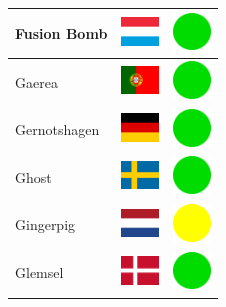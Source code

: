 \documentclass[12pt, a4paper, twoside]{report}
\begin{document}
\begin{center}
\begin{longtable}{|p{5cm}|p{2cm}|p{2cm}|}
Fusion Bomb & \includegraphics[width=1cm]{4x3/lu} & \includegraphics[width=1cm]{likes/y} \\ \hline
Gaerea & \includegraphics[width=1cm]{4x3/pt} & \includegraphics[width=1cm]{likes/y} \\ \hline
Gernotshagen & \includegraphics[width=1cm]{4x3/de} & \includegraphics[width=1cm]{likes/y} \\ \hline
Ghost & \includegraphics[width=1cm]{4x3/se} & \includegraphics[width=1cm]{likes/y} \\ \hline
Gingerpig & \includegraphics[width=1cm]{4x3/nl} & \includegraphics[width=1cm]{likes/m} \\ \hline
Glemsel & \includegraphics[width=1cm]{4x3/dk} & \includegraphics[width=1cm]{likes/y} \\ \hline

\end{longtable}
\end{center}
\end{document}

